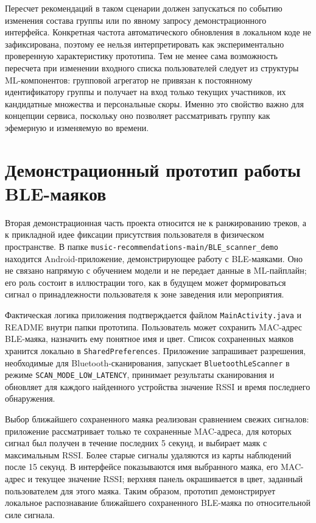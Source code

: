 Пересчет рекомендаций в таком сценарии должен запускаться по событию изменения состава группы или по явному запросу демонстрационного интерфейса. Конкретная частота автоматического обновления в локальном коде не зафиксирована, поэтому ее нельзя интерпретировать как экспериментально проверенную характеристику прототипа. Тем не менее сама возможность пересчета при изменении входного списка пользователей следует из структуры ML-компонентов: групповой агрегатор не привязан к постоянному идентификатору группы и получает на вход только текущих участников, их кандидатные множества и персональные скоры. Именно это свойство важно для концепции сервиса, поскольку оно позволяет рассматривать группу как эфемерную и изменяемую во времени.

\section{Демонстрационный прототип работы BLE-маяков}
\label{sec:ch6:ble-demo}

Вторая демонстрационная часть проекта относится не к ранжированию треков, а к прикладной идее фиксации присутствия пользователя в физическом пространстве. В папке \texttt{music-recommendations-main/BLE\_scanner\_demo} находится Android-приложение, демонстрирующее работу с BLE-маяками. Оно не связано напрямую с обучением модели и не передает данные в ML-пайплайн; его роль состоит в иллюстрации того, как в будущем может формироваться сигнал о принадлежности пользователя к зоне заведения или мероприятия.

Фактическая логика приложения подтверждается файлом \texttt{MainActivity.java} и README внутри папки прототипа. Пользователь может сохранить MAC-адрес BLE-маяка, назначить ему понятное имя и цвет. Список сохраненных маяков хранится локально в \texttt{SharedPreferences}. Приложение запрашивает разрешения, необходимые для Bluetooth-сканирования, запускает \texttt{BluetoothLeScanner} в режиме \texttt{SCAN\_MODE\_LOW\_LATENCY}, принимает результаты сканирования и обновляет для каждого найденного устройства значение RSSI и время последнего обнаружения.

Выбор ближайшего сохраненного маяка реализован сравнением свежих сигналов: приложение рассматривает только те сохраненные MAC-адреса, для которых сигнал был получен в течение последних 5 секунд, и выбирает маяк с максимальным RSSI. Более старые сигналы удаляются из карты наблюдений после 15 секунд. В интерфейсе показываются имя выбранного маяка, его MAC-адрес и текущее значение RSSI; верхняя панель окрашивается в цвет, заданный пользователем для этого маяка. Таким образом, прототип демонстрирует локальное распознавание ближайшего сохраненного BLE-маяка по относительной силе сигнала.

